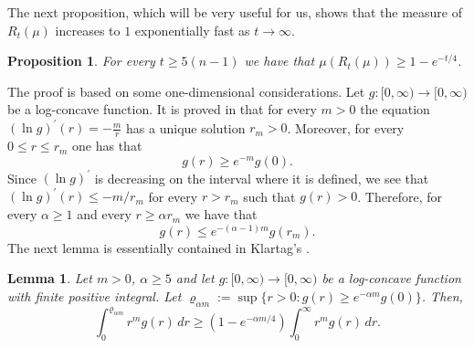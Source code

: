 \documentclass[11pt,leqno]{article}
\newtheorem{lemma}[theorem]{Lemma}
\newtheorem{proposition}[theorem]{Proposition}
\theoremstyle{definition}
\theoremstyle{remark}
\numberwithin{equation}{section}
\newcommand{\ls}{\leqslant}
\newcommand{\gr}{\geqslant}
\newcommand{\1}{\textbf{1}}
\begin{document}
The next proposition, which will be very useful for us, shows that the measure of $R_t(\mu)$ increases to $1$
exponentially fast as $t\to\infty $.

\begin{proposition}\label{prop:r-2}For every $t\gr 5(n-1)$ we have that $\mu(R_t(\mu ))\gr 1-e^{-t/4}$.
\end{proposition}

The proof is based on some one-dimensional considerations. Let $g:[0,\infty)\to[0,\infty)$ be a log-concave function. It is proved in \cite[Lemma~4.3]{Klartag-2007clt} that for every $m>0$ the equation $(\ln g)^{\prime}(r)=-\frac{m}{r}$ has a unique
solution $r_m>0$. Moreover, for every $0\ls r\ls r_m$ one has that
\begin{equation}\label{eq:r-1}g(r)\gr e^{-m}g(0).\end{equation}
Since $(\ln g)^{\prime}$ is decreasing on the interval where it is defined, we see that $(\ln g)^{\prime}(r)\ls -m/r_m$
for every $r>r_m$ such that $g(r)>0$. Therefore, for every $\alpha\gr 1$ and every $r\gr\alpha r_m$ we have that
\begin{equation}\label{eq:r-2}g(r)\ls e^{-(\alpha-1)m}g(r_m).\end{equation}
The next lemma is essentially contained in Klartag's \cite[Lemma~5.2]{Klartag-2007clt}.

\begin{lemma}\label{lem:r-1}Let $m> 0$, $\alpha\gr 5$ and let $g:[0,\infty)\to [0,\infty)$ be a log-concave
function with finite positive integral. Let $\varrho_{\alpha m}:=\sup\{r>0:g(r)\gr e^{-\alpha m}g(0)\}$. Then,
$$\int_0^{\varrho_{\alpha m}}r^{m}g(r)\,dr\gr\left(1-e^{-\alpha m/4}\right)\int_0^{\infty}r^{m}g(r)\,dr.$$
\end{lemma}
\end{document}
